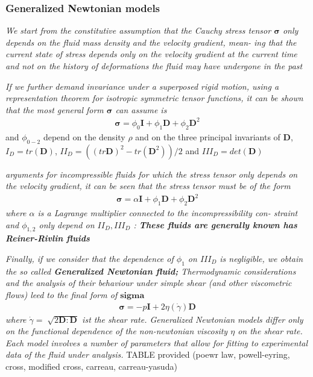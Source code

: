 \documentclass[11pt,letterpaper]{article}
\begin{document}
\subsubsection*{Generalized Newtonian models}


\textit{We start from the constitutive assumption that the Cauchy stress tensor $\bm{\sigma}$ only depends on the fluid mass density and the velocity gradient, mean- ing that the current state of stress depends only on the velocity gradient at the current time and not on the history of deformations the fluid may have undergone in the past}

\textit{If we further demand invariance under a superposed rigid motion, using a representation theorem for isotropic symmetric tensor functions, it can be shown that the most general form $\bm{\sigma}$ can assume is}
\begin{align}
\bm{\sigma} = \phi_0 \bm{I} + \phi_1 \bm{D} + \phi_2\bm{D}^2
\end{align}
and $\phi_{0-2}$ depend on the density $\rho$ and on the three principal invariants of $\bm{D}$, $I_D=tr(\bm{D})$, $II_D = ( (tr\bm{D})^2-tr(\bm{D}^2))/2$ and $III_D = det(\bm{D})$

\textit{arguments for incompressible fluids for which the stress tensor only depends on the velocity gradient, it can be seen that the stress tensor must be of the form
\begin{align}
\bm{\sigma} = \alpha \bm{I} + \phi_1 \bm{D} + \phi_2\bm{D}^2
\end{align}
where $\alpha$ is a Lagrange multiplier connected to the incompressibility con- straint and $\phi_{1,2}$ only depend on $II_D, III_D$ : \textbf{These fluids are generally known has Reiner-Rivlin fluids}}

\textit{Finally, if we consider that the dependence of $\phi_1$  on $III_D$ is negligible, we obtain the so called \textbf{Generalized Newtonian fluid;} Thermodynamic considerations and the analysis of their behaviour under simple shear (and other viscometric flows) leed to the final form of $ \bm{sigma}$}
\begin{align}
    \bm{\sigma} = -p\bm{I} + 2\eta(\Dot{\gamma}) \bm{D}
\end{align}
\textit{where $\Dot{\gamma} = \sqrt[]{2\bm{D}:\bm{D}}$ ist the shear rate. Generalized Newtonian models differ only on the  functional dependence of the non-newtonian viscosity $\eta$ on the shear rate. Each model involves a number of parameters that allow for fitting to experimental data of the fluid under analysis.} TABLE provided (poewr law, powell-eyring, cross, modified cross, carreau, carreau-yasuda)
\end{document}
